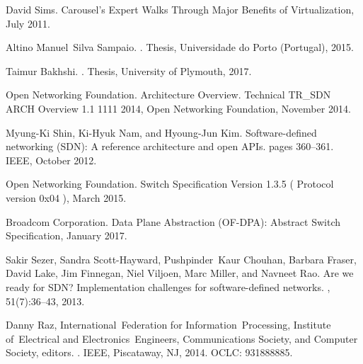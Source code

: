 \begin{thebibliography}{100}

 David Sims.
\newblock Carousel's {Expert} {Walks} {Through} {Major} {Benefits} of
  {Virtualization}, July 2011.

 Altino Manuel~Silva Sampaio.
.
 {Thesis}, Universidade do Porto (Portugal), 2015.

 Taimur Bakhshi.
.
 {Thesis}, University of Plymouth, 2017.

 {Open Networking Foundation}.
 {Architecture} {Overview}.
\newblock Technical TR\_SDN ARCH Overview 1.1 1111 2014, Open Networking
  Foundation, November 2014.

 Myung-Ki Shin, Ki-Hyuk Nam, and Hyoung-Jun Kim.
\newblock Software-defined networking ({SDN}): {A} reference architecture and
  open {APIs}.
\newblock pages 360--361. IEEE, October 2012.

 {Open Networking Foundation}.
 {Switch} {Specification} {Version} 1.3.5 ( {Protocol}
  version 0x04 ), March 2015.

 {Broadcom Corporation}.
 {Data} {Plane} {Abstraction} ({OF}-{DPA}):
  {Abstract} {Switch} {Specification}, January 2017.

 Sakir Sezer, Sandra Scott-Hayward, Pushpinder~Kaur Chouhan, Barbara Fraser,
  David Lake, Jim Finnegan, Niel Viljoen, Marc Miller, and Navneet Rao.
\newblock Are we ready for {SDN}? {Implementation} challenges for
  software-defined networks.
, 51(7):36--43, 2013.

 Danny Raz, International~Federation for Information~Processing, Institute
  of~Electrical {and} Electronics~Engineers, Communications Society, and
  Computer Society, editors.
.
\newblock IEEE, Piscataway, NJ, 2014.
\newblock OCLC: 931888885.


\end{thebibliography}
